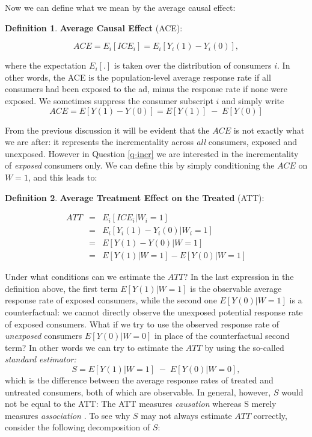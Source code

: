 \documentclass[11pt,a4paper]{article}
\theoremstyle{definition}
\newtheorem{definition}{Definition}[section]
\theoremstyle{remark}
\theoremstyle{definition}
\theoremstyle{definition}
\theoremstyle{definition}
\theoremstyle{definition}
\theoremstyle{definition}
\theoremstyle{definition}
\begin{document}
Now we can define what we mean by the average causal effect:

\begin{definition}\label{ace}
{\bf Average Causal Effect} (ACE):

$$
ACE = E_i[ ICE_i] = E_i [Y_i(1) - Y_i(0) ],
$$
\end{definition}
where the expectation $E_i[.]$ is taken over the distribution of consumers $i$. In other words, the ACE is the population-level average response rate if all consumers had been exposed to the ad, minus the response rate if none were exposed. We sometimes suppress the consumer subscript $i$ and simply write 
$$
ACE = E[ Y(1) - Y(0) ] = E [Y(1)] \; - \; E [Y(0)]
$$

From the previous discussion it will be evident that the $ACE$ is not exactly what we are after: it represents the incrementality across {\em all} consumers, exposed and unexposed. However in Question \ref{q-incr} we are interested in the incrementality of {\em exposed} consumers only. We can define this by simply conditioning the $ACE$ on $W=1$, and this leads to:

\begin{definition}\label{att}
{\bf Average Treatment Effect on the Treated} (ATT):

\begin{eqnarray}
ATT & = & E_i[ ICE_i | W_i = 1] \\
    & = & E_i [Y_i(1) - Y_i(0) | W_i = 1] 	\\
	& = & E[ Y(1) - Y(0) | W=1] \\
	& = & E[ Y(1) | W=1] - E[ Y(0) | W=1]
\end{eqnarray}

\end{definition}



Under what conditions can we estimate the $ATT$? In the last expression in the definition above, the first term $E[ Y(1) | W=1]$ is the observable average response rate of exposed consumers, while the second one $E[ Y(0) | W=1]$ is a counterfactual: we cannot directly observe the unexposed potential response rate of exposed consumers. What if we try to use the observed response rate of {\em unexposed} consumers $E[Y(0) | W=0]$ in place of the counterfactual second term? In other words we can try to estimate the $ATT$ by using the so-called {\em standard estimator:} 
$$
S = E[ Y(1) | W = 1]  \; -  \; E[ Y(0) | W = 0 ],
$$
which is the difference between the average response rates of treated and untreated consumers, both of which are observable. In general, however, $S$ would not be equal to the ATT: The ATT measures {\em causation} whereas S merely measures {\em association} \cite{elwert2013graphical}. To see why $S$ may not always estimate $ATT$ correctly, consider the following decomposition of $S$:
\end{document}
